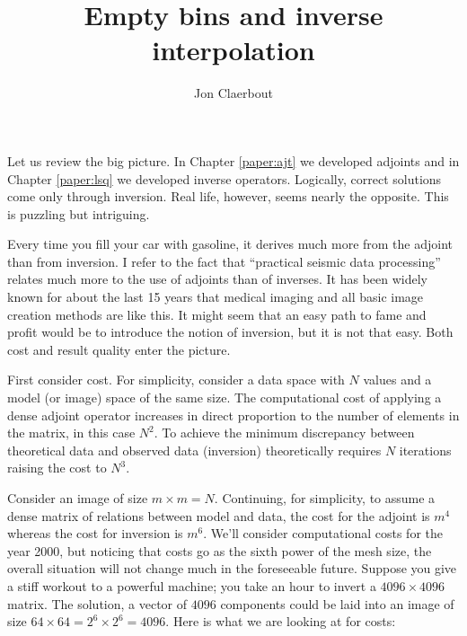 
\title{Empty bins and inverse interpolation}
\author{Jon Claerbout}
\maketitle

\label{paper:iin}
	

\par
Let us review the big picture.
In Chapter \ref{paper:ajt} we developed adjoints and
in Chapter \ref{paper:lsq} we developed inverse operators.
Logically, correct solutions come only through inversion.
Real life, however, seems nearly the opposite.
This is puzzling but intriguing.

\par
Every time you fill your car with gasoline,
it derives much more from the adjoint than from inversion.
I refer to the fact that ``practical seismic data processing''
relates much more to the use of adjoints than of inverses.
It has been widely known for about the last 15 years
that medical imaging and all basic image creation methods are like this.
It might seem that an easy path to fame and profit would
be to introduce the notion of inversion,
but it is not that easy.
Both cost and result quality enter the picture.

\par
First consider cost.
For simplicity, consider a data space with $N$ values
and a model (or image) space of the same size.
The computational cost of applying a dense adjoint
operator increases in direct proportion to the number
of elements in the matrix, in this case $N^2$.
To achieve the minimum discrepancy between theoretical data
and observed data (inversion) theoretically requires $N$ iterations
raising the cost to $N^3$.

\par
Consider an image of size $m\times m=N$.
Continuing, for simplicity, to assume a dense matrix of relations between
model and data,
the cost for the adjoint is $m^4$ whereas the cost for inversion is $m^6$.
We'll consider computational costs for the year 2000, but
noticing that costs go as the sixth power of the mesh size,
the overall situation will not change much in the foreseeable future.
Suppose you give a stiff workout to a powerful machine;
you take an hour to invert a $4096\times 4096$ matrix.
The solution, a vector of $4096$ components could
be laid into an image of size $64\times 64= 2^6\times 2^6 = 4096$.
Here is what we are looking at for costs:

